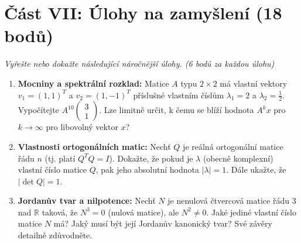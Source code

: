 \documentclass[a4paper,11pt]{article}
\begin{document}
\vspace{0.5cm}

\section*{Část VII: Úlohy na zamyšlení (18 bodů)}
\textit{Vyřešte nebo dokažte následující náročnější úlohy. (6 bodů za každou úlohu)}

\begin{enumerate}
    \item \textbf{Mocniny a spektrální rozklad:} Matice $A$ typu $2 \times 2$ má vlastní vektory $v_1 = (1, 1)^T$ a $v_2 = (1, -1)^T$ příslušné vlastním číslům $\lambda_1 = 2$ a $\lambda_2 = \frac{1}{2}$. Vypočítejte $A^{10} \begin{pmatrix} 3 \\ 1 \end{pmatrix}$. Lze limitně určit, k čemu se blíží hodnota $A^k x$ pro $k \to \infty$ pro libovolný vektor $x$?

    \item \textbf{Vlastnosti ortogonálních matic:} Nechť $Q$ je reálná ortogonální matice řádu $n$ (tj. platí $Q^T Q = I$).
    Dokažte, že pokud je $\lambda$ (obecně komplexní) vlastní číslo matice $Q$, pak jeho absolutní hodnota $|\lambda| = 1$. Dále ukažte, že $|\det Q| = 1$.

    \item \textbf{Jordanův tvar a nilpotence:} Nechť $N$ je nenulová čtvercová matice řádu $3$ nad $\mathbb{R}$ taková, že $N^3 = 0$ (nulová matice), ale $N^2 \neq 0$. Jaké jediné vlastní číslo matice $N$ má? Jaký musí být její Jordanův kanonický tvar? Své závěry detailně zdůvodněte.
\end{enumerate}
\end{document}
